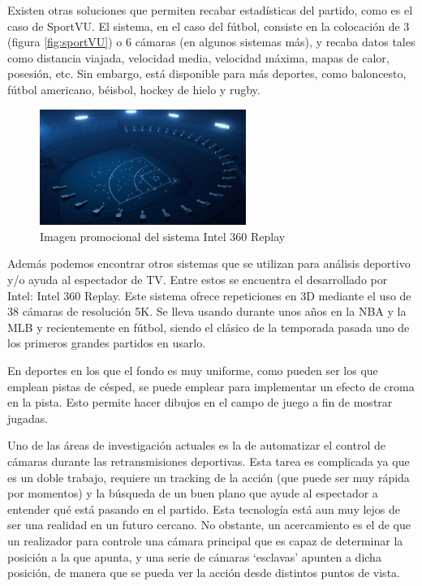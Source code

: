 Existen otras soluciones que permiten recabar estadísticas del partido, como es el caso de SportVU. El sistema, en el caso del fútbol, consiste en la colocación de 3 (figura \ref{fig:sportVU}) o 6 cámaras (en algunos sistemas más), y recaba datos tales como distancia viajada, velocidad media, velocidad máxima, mapas de calor, posesión, etc. Sin embargo, está disponible para más deportes, como baloncesto, fútbol americano, béisbol, hockey de hielo y rugby.

\begin{figure}
    \centering
    \includegraphics[width=0.6\textwidth]{images/intel360}
    \caption{Imagen promocional del sistema Intel 360 Replay}
    \label{fig:intel360}
\end{figure}

Además podemos encontrar otros sistemas que se utilizan para análisis deportivo y/o ayuda al espectador de TV. Entre estos se encuentra el desarrollado por Intel: Intel 360 Replay. Este sistema ofrece repeticiones en 3D mediante el uso de 38 cámaras de resolución 5K. Se lleva usando durante unos años en la NBA y la MLB y recientemente en fútbol, siendo el clásico de la temporada pasada uno de los primeros grandes partidos en usarlo.

En deportes en los que el fondo es muy uniforme, como pueden ser los que emplean pistas de césped, se puede emplear para implementar un efecto de croma en la pista. Esto permite hacer dibujos en el campo de juego a fin de mostrar jugadas.

Uno de las áreas de investigación actuales es la de automatizar el control de cámaras durante las retransmisiones deportivas. Esta tarea es complicada ya que es un doble trabajo, requiere un tracking de la acción (que puede ser muy rápida por momentos) y la búsqueda de un buen plano que ayude al espectador a entender qué está pasando en el partido. Esta tecnología está aun muy lejos de ser una realidad en un futuro cercano. No obstante, un acercamiento es el de que un realizador para controle una cámara principal que es capaz de determinar la posición a la que apunta, y una serie de cámaras `esclavas' apunten a dicha posición, de manera que se pueda ver la acción desde distintos puntos de vista. \cite{book:cvInSports}
